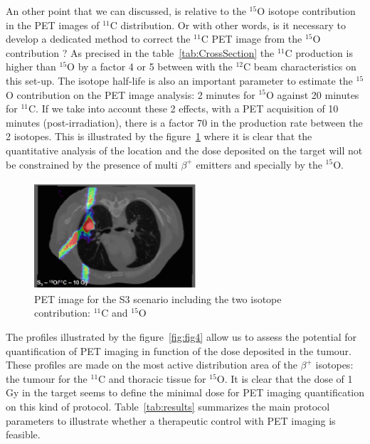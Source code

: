 \documentclass[11pt]{iopart}
\begin{document}
An other point that we can discussed, is relative to the  $^{15}$O isotope contribution in the PET images of $^{11}$C distribution. Or with other words, is it necessary to develop a dedicated method to correct the $^{11}$C PET image from the $^{15}$O contribution ? As precised in the table~\ref{tab:CrossSection} the $^{11}$C production is higher than $^{15}$O by a factor 4 or 5 between with the $^{12}$C beam characteristics on this set-up. The isotope half-life is also an important parameter to estimate the $^{15}$O contribution on the PET image analysis: 2 minutes for $^{15}$O against 20 minutes for $^{11}$C. If we take into account these 2 effects, with a PET acquisition of 10 minutes (post-irradiation), there is a factor 70 in the production rate between the 2 isotopes. This is illustrated by the figure~\ref{fig:fig5} where it is clear that the quantitative analysis of the location and the dose deposited on the target will not be constrained by the presence of multi $\beta^+$ emitters and specially by the $^{15}$O.


\begin{figure}[!h]
\begin{center}
\includegraphics[width=6cm,height=40mm]{figures/C11_O15_10Gy_v1.jpg}
\caption{PET image for the S3 scenario including the two isotope contribution: $^{11}$C and $^{15}$O}
\end{center}
\label{fig:fig5}
\end{figure} 

The profiles illustrated by the figure~\ref{fig:fig4} allow us to assess the potential for quantification of PET imaging in function of the dose deposited in the tumour. These profiles are made on the most active distribution area of the $\beta^+$ isotopes: the tumour for the $^{11}$C and thoracic tissue for $^{15}$O. It is clear that the dose of 1 Gy in the target seems to define the minimal dose for PET imaging quantification on this kind of protocol. Table~\ref{tab:results} summarizes the main protocol parameters to illustrate whether a therapeutic control with PET imaging is feasible.
\end{document}
